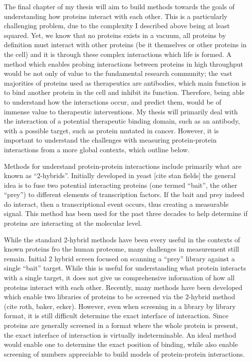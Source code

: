 The final chapter of my thesis will aim to build methods towards the goals of understanding how proteins interact with each other. This is a particularly challenging problem, due to the complexity I described above being at least squared. Yet, we know that no proteins exists in a vacuum, all proteins by definition must interact with other proteins (be it themselves or other proteins in the cell) and it is through these complex interactions which life is formed.  A method which enables probing interactions between proteins in high throughput would be not only of value to the fundamental research community; the vast majorities of proteins used as therapeutics are antibodies, which main function is to bind another protein in the cell and inhibit its function. Therefore, being able to understand how the interactions occur, and predict them, would be of immense value to therapeutic interventions. My thesis will primarily deal with the interaction of a potential therapeutic binding domain, such as an antibody, with a possible target, such as protein mutated in cancer. However, it is important to understand the challenges with measuring protein-protein interactions from a more global contexts, which outline below.

Methods for understand protein-protein interactions include primarily what are known as “2-hybrids”. Initially developed in yeast [cite stan fields] the general idea is to fuse two potential interacting proteins (one termed “bait”, the other “prey”) to different elements of transcription factors. If the bait and prey indeed do interact, then a transcriptional event occurs, thus creating a measurable signal. This method has been used for the past three decades to help determine if proteins are interacting at the molecular level. 

While the standard 2-hybrid methods have been every useful in the contexts of known proteins fro the human proteome, many challenges in measurement still remain. Initial 2 hybrid screen focused on scanning a “prey” library against a single “bait” target. While this is useful for understanding what protein interacts with a single target, it does not give us comprehensive information of how all proteins interact with each other. Recently, many methods have been developed which enable two libraries of proteins to be screened via the 2-hybrid method (cite roth, baker, ecker). However, even when screening in a library by library format, it is still difficult determine the exact interface of interaction. Since proteins are generally screened in a format where the whole protein is present, the exact interface of interaction is virtually indeterminable. An ideal method would enable one to determine the exact position of binding, while also enable screening of numbers appreciable to build models of protein-protein interactions.

